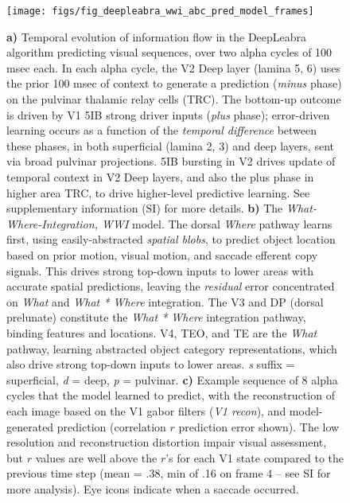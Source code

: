 \documentclass[12pt,twoside]{naturefigs}  %
\newif\myifpdf
\begin{document}
\begin{figure}
  \centering\texttt{[image: figs/fig\_deepleabra\_wwi\_abc\_pred\_model\_frames]}
  \caption{\small \protect{} {\bf a)} Temporal evolution of information flow in the DeepLeabra algorithm predicting visual sequences, over two alpha cycles of 100 msec each.   In each alpha cycle, the V2 Deep layer (lamina 5, 6) uses the prior 100 msec of context to generate a prediction ({\em minus} phase) on the pulvinar thalamic relay cells (TRC). The bottom-up outcome is driven by V1 5IB strong driver inputs ({\em plus} phase); error-driven learning occurs as a function of the {\em temporal difference} between these phases, in both superficial (lamina 2, 3) and deep layers, sent via broad pulvinar projections. 5IB bursting in V2 drives update of temporal context in V2 Deep layers, and also the plus phase in higher area TRC, to drive higher-level predictive learning.  See supplementary information (SI) for more details. {\bf b)} The {\em What-Where-Integration, WWI} model. The dorsal {\em Where} pathway learns first, using easily-abstracted {\em spatial blobs}, to predict object location based on prior motion, visual motion, and saccade efferent copy signals.  This drives strong top-down inputs to lower areas with accurate spatial predictions, leaving the {\em residual} error concentrated on {\em What} and {\em What * Where} integration.  The V3 and DP (dorsal prelunate) constitute the {\em What * Where} integration pathway, binding features and locations.  V4, TEO, and TE are the {\em What} pathway, learning abstracted object category representations, which also drive strong top-down inputs to lower areas.  {\em s} suffix = superficial, {\em d} = deep, {\em p} = pulvinar. {\bf c)} Example sequence of 8 alpha cycles that the model learned to predict, with the reconstruction of each image based on the V1 gabor filters ({\em V1 recon}), and model-generated prediction (correlation $r$ prediction error shown).  The low resolution and reconstruction distortion impair visual assessment, but $r$ values are well above the $r$'s for each V1 state compared to the previous time step (mean = .38, min of .16 on frame 4 -- see SI for more analysis).  Eye icons indicate when a saccade occurred.}
  \label{fig.model}
\end{figure}
\end{document}
